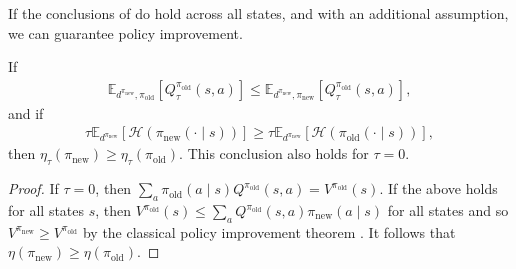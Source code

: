 \documentclass[twoside,11pt]{article}
\newcommand{\Ex}{\mathbb{E}}
\newcommand{\entropy}{\mathcal{H}}
\newcommand{\pinew}{{\pi_\mathrm{new}}}
\newcommand{\piold}{{\pi_\mathrm{old}}}
\begin{document}
If the conclusions of  do hold across all states, and with an additional assumption, we can guarantee policy improvement. 
\begin{corollary}\label{cor:fkl-pi}
If 
\begin{align*}
    \Ex_{d^\pinew, \piold}[ Q^\piold_\tau(s, a)]\leq \Ex_{d^\pinew, \pinew}[Q^\piold_\tau(s, a)],
\end{align*}
and if 
\begin{align*}
    \tau \Ex_{d^\pinew}[\entropy(\pinew(\cdot \mid s))] \geq \tau \Ex_{d^\pinew}[\entropy(\piold(\cdot \mid s))],
\end{align*}
then $\eta_\tau(\pinew) \geq \eta_\tau(\piold)$. This conclusion also holds for $\tau = 0$.
\end{corollary}
\begin{proof}
If $\tau = 0$, then $\sum_a \piold(a \mid s) Q^{\piold}(s, a) = V^{\piold}(s)$. If the above holds for all states $s$, then $V^{\piold}(s) \leq \sum_a Q^{\piold}(s, a) \pinew(a \mid s)$ for all states and so $V^{\pinew} \geq V^{\piold}$ by the classical policy improvement theorem \citep{sutton2018reinforcement}. It follows that $\eta(\pinew) \geq \eta(\piold)$.


\end{proof}
\end{document}
